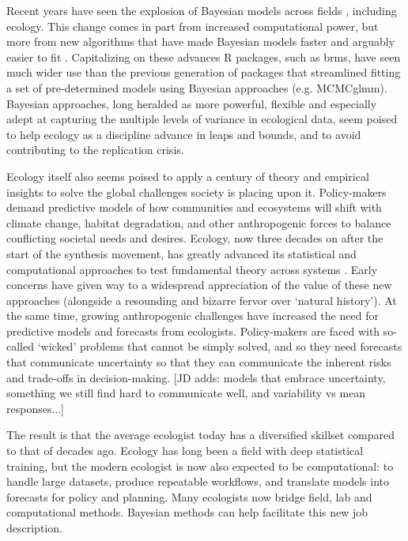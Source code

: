 \documentclass[11pt]{article}
\begin{document}
{Recent years have seen the explosion of Bayesian models across fields \citep{vandeschoot2021,schad2021,grinsztajn2021}, including ecology. This change comes in part from increased computational power, but more from new algorithms \citep[e.g. Hamiltonian Monte Carlo,][]{nuts2014,betan2019} that have made Bayesian models faster and arguably easier to fit \citep{Carpenter:2017stan}. Capitalizing on these advances \textsf{R} packages, such as \textsf{brms}, have seen much wider use than the previous generation of packages that streamlined fitting a set of pre-determined models using Bayesian approaches (e.g. \textsf{MCMCglmm}). Bayesian approaches, long heralded as more powerful, flexible and especially adept at capturing the multiple levels of variance in ecological data, seem poised to help ecology as a discipline advance in leaps and bounds, and to avoid contributing to the replication crisis.

Ecology itself also seems poised to apply a century of theory and empirical insights to solve the global challenges society is placing upon it.
Policy-makers demand predictive models of how communities and ecosystems will shift with climate change, habitat degradation, and other anthropogenic forces to balance conflicting societal needs and desires. Ecology, now three decades on after the start of the synthesis movement, has greatly advanced its statistical and computational approaches to test fundamental theory across systems \citep{Hampton2013}. Early concerns have given way to a widespread appreciation of the value of these new approaches (alongside a resounding and bizarre fervor over `natural history').
At the same time, growing anthropogenic challenges have increased the need for predictive models and forecasts from ecologists. Policy-makers are faced with so-called `wicked' problems that cannot be simply solved, and so they need forecasts that communicate uncertainty so that they can communicate the inherent risks and trade-offs in decision-making.
[JD adds: models that embrace uncertainty, something we still find hard to communicate well, and variability vs mean responses...]

The result is that the average ecologist today has a diversified skillset compared to that of decades ago. Ecology has long been a field with deep statistical training, but the modern ecologist is now also expected to be computational: to handle large datasets, produce repeatable workflows, and translate models into forecasts for policy and planning. Many ecologists now bridge field, lab and computational methods. Bayesian methods can help facilitate this new job description. %

}
\end{document}
